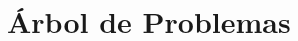 
\appendix
\setcounter{section}{0}%
\renewcommand{\thesection}{\Alph{section}}%
	
	\section{Árbol de Problemas}
	\label{anexo1}
